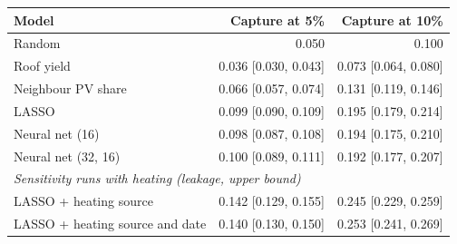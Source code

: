 \begin{tabular}{p{3.4cm}rr}
\toprule
Model & Capture at 5\% & Capture at 10\% \\
\midrule
Random & 0.050 & 0.100 \\
Roof yield & 0.036 [0.030, 0.043] & 0.073 [0.064, 0.080] \\
Neighbour PV share & 0.066 [0.057, 0.074] & 0.131 [0.119, 0.146] \\
LASSO & 0.099 [0.090, 0.109] & 0.195 [0.179, 0.214] \\
Neural net (16) & 0.098 [0.087, 0.108] & 0.194 [0.175, 0.210] \\
Neural net (32, 16) & 0.100 [0.089, 0.111] & 0.192 [0.177, 0.207] \\
\midrule
\multicolumn{3}{l}{\textit{Sensitivity runs with heating (leakage, upper bound)}} \\
LASSO + heating source & 0.142 [0.129, 0.155] & 0.245 [0.229, 0.259] \\
LASSO + heating source and date & 0.140 [0.130, 0.150] & 0.253 [0.241, 0.269] \\
\bottomrule
\end{tabular}

